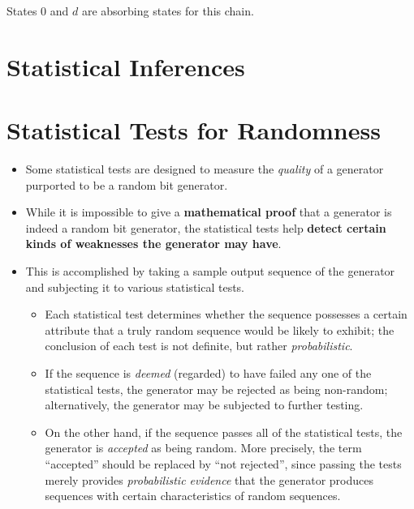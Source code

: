 \documentclass[12pt,openany]{book}
\theoremstyle{definition}
\begin{document}
	
	States 0 and \( d \) are absorbing states for this chain.
	
	\newpage
	\chapter{Statistical Inferences}
	
	\newpage
	\chapter{Statistical Tests for Randomness}
	
	\begin{itemize}
		\item Some statistical tests are designed to measure the \textit{quality} of a generator purported to be a random bit generator.
		\item While it is impossible to give a \textbf{mathematical proof} that a generator is indeed a random bit generator, the statistical tests help \textbf{detect certain kinds of weaknesses the generator may have}.
		\item This is accomplished by taking a sample output sequence of the generator and subjecting it to various statistical tests.
		\begin{itemize}
			\item Each statistical test determines whether the sequence possesses a certain attribute that a truly random sequence would be likely to exhibit; the conclusion of each test is not definite, but rather \textit{probabilistic}.
			\item If the sequence is \textit{deemed} (regarded) to have failed any one of the statistical tests, the generator may be rejected as being non-random; alternatively, the generator may be subjected to further testing.
			\item On the other hand, if the sequence passes all of the statistical tests, the generator is \textit{accepted} as being random. More precisely, the term ``accepted'' should be replaced by ``not rejected'', since passing the tests merely provides \textit{probabilistic evidence} that the generator produces sequences with certain characteristics of random sequences.
		\end{itemize}
	\end{itemize}
	
\end{document}
